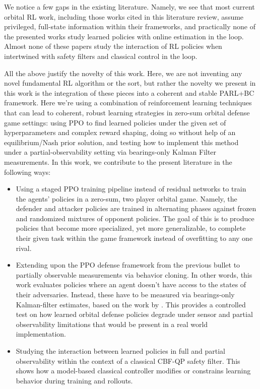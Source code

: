 We notice a few gaps in the existing literature. Namely, we see that most current orbital RL work, including those works cited in this literature review, assume privileged, full-state information within their frameworks, and practically none of the presented works study learned policies with online estimation in the loop. Almost none of these papers study the interaction of RL policies when intertwined with safety filters and classical control in the loop. 

All the above justify the novelty of this work. Here, we are not inventing any novel fundamental RL algorithm or the sort, but rather the novelty we present in this work is the integration of these pieces into a coherent and stable PARL+BC framework. Here we're using a combination of reinforcement learning techniques that can lead to coherent, robust learning strategies in zero-sum orbital defense game settings: using PPO to find learned policies under the given set of hyperparameters and complex reward shaping, doing so without help of an equilibrium/Nash prior solution, and testing how to implement this method under a partial-observability setting via bearings-only Kalman Filter measurements. In this work, we contribute to the present literature in the following ways:

\begin{itemize}
    \item Using a staged PPO training pipeline instead of residual networks to train the agents' policies in a zero-sum, two player orbital game. Namely, the defender and attacker policies are trained in alternating phases against frozen and randomized mixtures of opponent policies. The goal of this is to produce policies that become more specialized, yet more generalizable, to complete their given task within the game framework instead of overfitting to any one rival. 

    \item Extending upon the PPO defense framework from the previous bullet to partially observable measurements via behavior cloning. In other words, this work evaluates policies where an agent doesn't have access to the states of their adversaries. Instead, these have to be measured via bearings-only Kalman-filter estimates, based on the work by \cite{aidala1979kalman}. This provides a controlled test on how learned orbital defense policies degrade under sensor and partial observability limitations that would be present in a real world implementation.
    \item Studying the interaction between learned policies in full and partial observability within the context of a classical CBF-QP safety filter. This shows how a model-based classical controller modifies or constrains learning behavior during training and rollouts.
\end{itemize}


